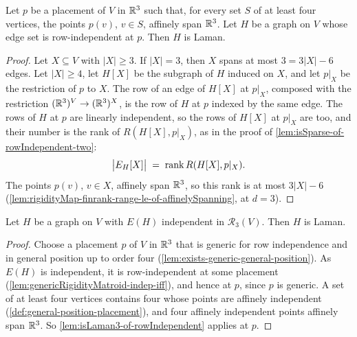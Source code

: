 \begin{lemma}
  \label{lem:isLaman3-of-rowIndependent}
  \leanok
  Let $p$ be a placement of $V$ in $\R^3$ such that, for every set $S$
  of at least four vertices, the points $p(v)$, $v \in S$, affinely
  span $\R^3$. Let $H$ be a graph on $V$ whose edge set is
  row-independent at $p$. Then $H$ is Laman.
\end{lemma}
\begin{proof}
  \leanok
  Let $X \subseteq V$ with $|X| \ge 3$. If $|X| = 3$, then $X$ spans at
  most $3 = 3|X| - 6$ edges. Let $|X| \ge 4$, let $H[X]$ be the subgraph
  of $H$ induced on $X$, and let $p|_X$ be the restriction of $p$ to
  $X$. The row of an edge of $H[X]$ at $p|_X$, composed with the
  restriction $(\R^3)^V \to (\R^3)^X$, is the row of $H$ at $p$ indexed
  by the same edge. The rows of $H$ at $p$ are linearly independent, so
  the rows of $H[X]$ at $p|_X$ are too, and their number is the rank of
  $R(H[X], p|_X)$, as in the proof of
  \cref{lem:isSparse-of-rowIndependent-two}:
  \[
    \bigl|\edgesIn[H]{X}\bigr| \;=\; \operatorname{rank} R(H[X], p|_X).
  \]
  The points $p(v)$, $v \in X$, affinely span $\R^3$, so this rank is at
  most $3|X| - 6$
  (\cref{lem:rigidityMap-finrank-range-le-of-affinelySpanning}, at
  $d = 3$).
\end{proof}

\begin{corollary}
  \label{cor:genericMatroid-indep-isLaman3}
  \leanok
  Let $H$ be a graph on $V$ with $E(H)$ independent in
  $\mathcal{R}_3(V)$. Then $H$ is Laman.
\end{corollary}
\begin{proof}
  \leanok
  Choose a placement $p$ of $V$ in $\R^3$ that is generic for row
  independence and in general position up to order four
  (\cref{lem:exists-generic-general-position}). As $E(H)$ is
  independent, it is row-independent at some placement
  (\cref{lem:genericRigidityMatroid-indep-iff}), and hence at $p$, since
  $p$ is generic. A set of at least four vertices contains four whose
  points are affinely independent
  (\cref{def:general-position-placement}), and four affinely independent
  points affinely span $\R^3$. So \cref{lem:isLaman3-of-rowIndependent}
  applies at $p$.
\end{proof}

